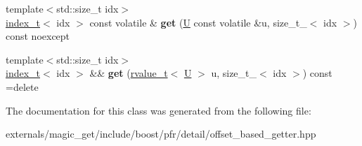 \begin{DoxyCompactItemize}
{\footnotesize template$<$std\+::size\+\_\+t idx$>$ }\\\mbox{\hyperlink{structindex__t}{index\+\_\+t}}$<$ idx $>$ const volatile \& {\bfseries get} (\mbox{\hyperlink{union_u}{U}} const volatile \&u, size\+\_\+t\+\_\+$<$ idx $>$) const noexcept
\item 
\mbox{\label{classboost_1_1pfr_1_1detail_1_1offset__based__getter_ae98d55c2641f7bedec5b30d3bfe82f7b}} 
{\footnotesize template$<$std\+::size\+\_\+t idx$>$ }\\\mbox{\hyperlink{structindex__t}{index\+\_\+t}}$<$ idx $>$ \&\& {\bfseries get} (\mbox{\hyperlink{struct_t}{rvalue\+\_\+t}}$<$ \mbox{\hyperlink{union_u}{U}} $>$ u, size\+\_\+t\+\_\+$<$ idx $>$) const =delete
\end{DoxyCompactItemize}


The documentation for this class was generated from the following file\+:\begin{DoxyCompactItemize}
\item 
externals/magic\+\_\+get/include/boost/pfr/detail/offset\+\_\+based\+\_\+getter.\+hpp\end{DoxyCompactItemize}
